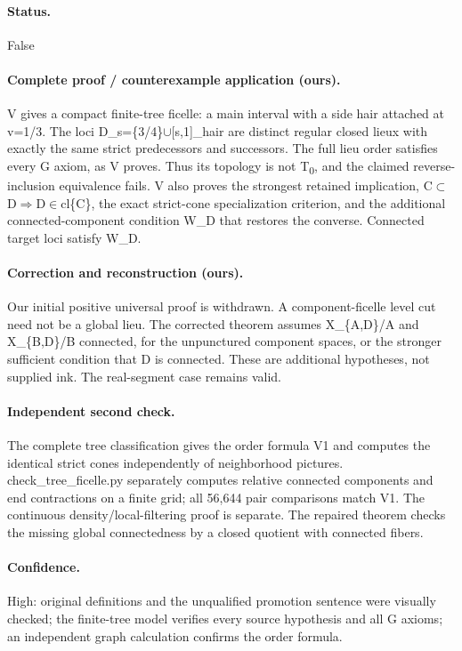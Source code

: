 \paragraph{Status.} False

\paragraph{Complete proof / counterexample application (ours).} V gives a compact finite-tree ficelle: a main interval with a side hair attached at v=1/3. The loci D\_s=\{3/4\}\ensuremath{\cup}[s,1]\_hair are distinct regular closed lieux with exactly the same strict predecessors and successors. The full lieu order satisfies every G axiom, as V proves. Thus its topology is not T\textsubscript{0}, and the claimed reverse-inclusion equivalence fails. V also proves the strongest retained implication, C\ensuremath{\subset}D\ensuremath{\Rightarrow}D\ensuremath{\in}cl\{C\}, the exact strict-cone specialization criterion, and the additional connected-component condition W\_D that restores the converse. Connected target loci satisfy W\_D.

\paragraph{Correction and reconstruction (ours).} Our initial positive universal proof is withdrawn. A component-ficelle level cut need not be a global lieu. The corrected theorem assumes X\_\{A,D\}/A and X\_\{B,D\}/B connected, for the unpunctured component spaces, or the stronger sufficient condition that D is connected. These are additional hypotheses, not supplied ink. The real-segment case remains valid.

\paragraph{Independent second check.} The complete tree classification gives the order formula V1 and computes the identical strict cones independently of neighborhood pictures. check\_tree\_ficelle.py separately computes relative connected components and end contractions on a finite grid; all 56,644 pair comparisons match V1. The continuous density/local-filtering proof is separate. The repaired theorem checks the missing global connectedness by a closed quotient with connected fibers.

\paragraph{Confidence.} High: original definitions and the unqualified promotion sentence were visually checked; the finite-tree model verifies every source hypothesis and all G axioms; an independent graph calculation confirms the order formula.

